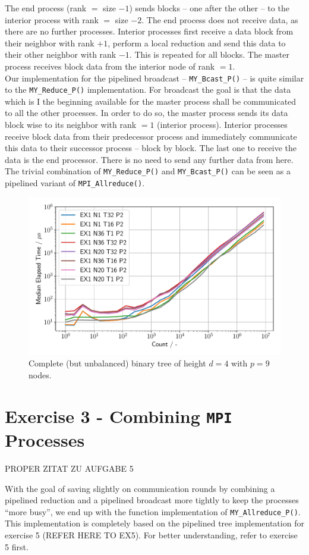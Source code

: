 The end process (rank $=$ size $-1$) sends blocks – one after the other -- to the interior process with 
rank $=$ size $-2$. The end process does not receive data, as there are no further processes. Interior processes 
first receive a data block from their neighbor with rank $+1$, perform a local reduction and send this data to their 
other neighbor with rank $-1$. This is repeated for all blocks. The master process receives block data from the interior 
node of rank $=1$.\\

Our implementation for the pipelined broadcast -- \texttt{MY\_Bcast\_P()} – is quite similar to the 
\texttt{MY\_Reduce\_P()} implementation. For broadcast the goal is that the data which is I the beginning 
available for the master process shall be communicated to all the other processes. In order to do so, the master 
process sends its data block wise to its neighbor with rank $=1$ (interior process). Interior processes receive block 
data from their predecessor process and immediately communicate this data to their successor process – block by 
block. The last one to receive the data is the end processor. There is no need to send any further data from here.\\

The trivial combination of \texttt{MY\_Reduce\_P()} and \texttt{MY\_Bcast\_P()} can be seen as a pipelined variant 
of \texttt{MPI\_Allreduce()}.\\

\begin{figure}[h]
    \begin{center}
        \includegraphics[width=0.3\linewidth]{figures/Ex1_2.pdf}
        \caption{Complete (but unbalanced) binary tree of height $d = 4$ with $p = 9$ nodes.}
    \end{center}
\end{figure}
\pagebreak

\section{Exercise 3 - Combining \texttt{MPI} Processes}

PROPER ZITAT ZU AUFGABE 5

With the goal of saving slightly on communication rounds by combining a pipelined reduction and a 
pipelined broadcast more tightly to keep the processes “more busy”, we end up with the function implementation 
of \texttt{MY\_Allreduce\_P()}. This implementation is completely based on the pipelined tree 
implementation for exercise 5 (REFER HERE TO EX5). For better understanding, refer to exercise 5 first.\\

